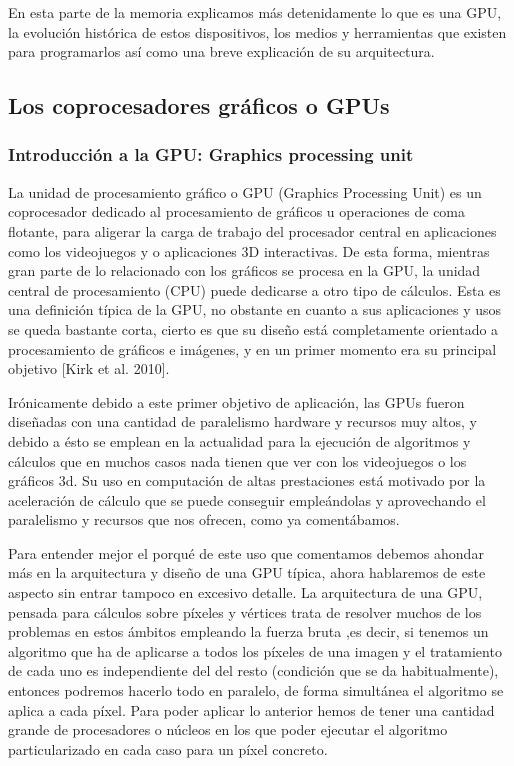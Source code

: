 En esta parte de la memoria explicamos más detenidamente lo que es una GPU, la evolución histórica de estos dispositivos, los medios y herramientas que existen para programarlos así como una breve explicación de su arquitectura.

\subsection{Los coprocesadores gráficos o GPUs}

\subsubsection*{Introducción a la GPU: Graphics processing unit}

La unidad de procesamiento gráfico o GPU (Graphics Processing Unit) es un coprocesador dedicado al procesamiento de gráficos u operaciones de coma flotante, para aligerar la carga de trabajo del procesador central en aplicaciones como los videojuegos y o aplicaciones 3D interactivas. De esta forma, mientras gran parte de lo relacionado con los gráficos se procesa en la GPU, la unidad central de procesamiento (CPU) puede dedicarse a otro tipo de cálculos.
Esta es una definición típica de la GPU, no obstante en cuanto a sus aplicaciones y usos se queda bastante corta, cierto es que su diseño está completamente orientado a procesamiento de gráficos e imágenes, y en un primer momento era su principal objetivo [Kirk et al. 2010]. 

Irónicamente debido a este primer objetivo de aplicación, las GPUs fueron diseñadas con una cantidad de paralelismo hardware y recursos muy altos, y debido a ésto se emplean en la actualidad para la ejecución de algoritmos y cálculos que en muchos casos nada tienen que ver con los videojuegos o los gráficos 3d.
Su uso en computación de altas prestaciones está motivado por la aceleración de cálculo que se puede conseguir empleándolas y aprovechando el paralelismo y recursos que nos ofrecen, como ya comentábamos.

Para entender mejor el porqué de este uso que comentamos debemos ahondar más en la arquitectura y diseño de una GPU típica, ahora hablaremos de este aspecto sin entrar tampoco en excesivo detalle.
La arquitectura de una GPU, pensada para cálculos sobre píxeles y vértices trata de resolver muchos de los problemas en estos ámbitos empleando la fuerza bruta ,es decir, si tenemos un algoritmo que ha de aplicarse a todos los píxeles de una imagen y el tratamiento de cada uno es independiente del del resto (condición que se da habitualmente), entonces podremos hacerlo todo en paralelo, de forma simultánea el algoritmo se aplica a cada píxel. Para poder aplicar lo anterior hemos de tener una cantidad grande de procesadores o núcleos en los que poder ejecutar el algoritmo particularizado en cada caso para un píxel concreto.

